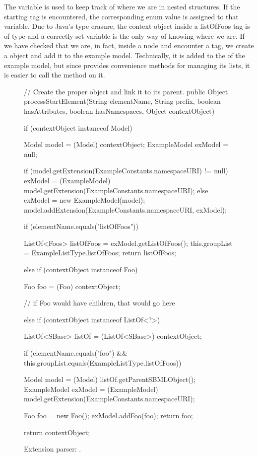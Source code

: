 The  variable is used to keep track of where we are in
nested structures.  If the  starting tag is encountered,
the corresponding enum value is assigned to that variable.  Due to Java's
type erasure, the context object inside a listOfFoos tag is of type
 and a correctly set  variable is the only
way of knowing where we are.  If we have checked that we are, in fact,
inside a  node and encounter a  tag, we create a
 object and add it to the example model.  Technically, it is
added to the  of the example model, but since
 provides convenience methods for managing its lists, it
is easier to call the  method on it.

\begin{figure}[htb]
  \begin{example}[numbers=left]
// Create the proper object and link it to its parent.
public Object processStartElement(String elementName, String prefix,
    boolean hasAttributes, boolean hasNamespaces, Object contextObject) {

  if (contextObject instanceof Model) {
    Model model = (Model) contextObject;
    ExampleModel exModel = null;

    if (model.getExtension(ExampleConstants.namespaceURI) != null) {
      exModel = (ExampleModel) model.getExtension(ExampleConstants.namespaceURI);
    } else {
      exModel = new ExampleModel(model);
      model.addExtension(ExampleConstants.namespaceURI, exModel);
    }

    if (elementName.equals("listOfFoos")) {

      ListOf<Foos> listOfFoos = exModel.getListOfFoos();
      this.groupList = ExampleListType.listOfFoos;
      return listOfFoos;
    }
  } else if (contextObject instanceof Foo) {
    Foo foo = (Foo) contextObject;

    // if Foo would have children, that would go here

  }
  else if (contextObject instanceof ListOf<?>) {
    ListOf<SBase> listOf = (ListOf<SBase>) contextObject;

    if (elementName.equals("foo") && this.groupList.equals(ExampleListType.listOfFoos)) {
      Model model = (Model) listOf.getParentSBMLObject();
      ExampleModel exModel = (ExampleModel) model.getExtension(ExampleConstants.namespaceURI);

      Foo foo = new Foo();
      exModel.addFoo(foo);
      return foo;
    }
  }
  return contextObject;
}\end{example}
  \caption{Extension parser: .}
  \label{lst:ModelExtParserStartElement}
\end{figure}

